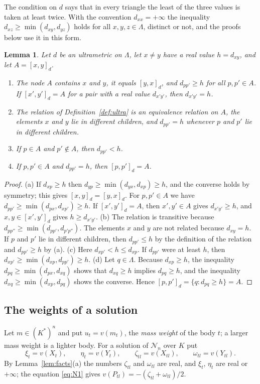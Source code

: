 \documentclass[11pt]{amsart}
\newtheorem{lemma}[theorem]{Lemma}
\theoremstyle{definition}
\theoremstyle{remark}
\numberwithin{equation}{section}
\newcommand{\cN}{\mathcal{N}}
\newcommand{\nd}[2]{[#1]_{#2}}
\begin{document}
The condition on $d$ says that in every triangle the least of the three values is taken at least twice.
With the convention $d_{xx} = +\infty$ the inequality $d_{xz} \ge \min(d_{xy}, d_{yz})$ holds for all
$x, y, z \in \Lambda$, distinct or not, and the proofs below use it in this form.

\begin{lemma}\label{lem:tree}
Let $d$ be an ultrametric on $\Lambda$, let $x \ne y$ have a real value $h = d_{xy}$, and let
$A = \nd{x, y}{d}$.
\begin{enumerate}
\item[(a)] The node $A$ contains $x$ and $y$, it equals $\nd{y, x}{d}$, and $d_{pp'} \ge h$ for all
$p, p' \in A$. If $\nd{x', y'}{d} = A$ for a pair with a real value $d_{x'y'}$, then $d_{x'y'} = h$.
\item[(b)] The relation of Definition~\ref{def:ultra} is an equivalence relation on $A$, the elements $x$
and $y$ lie in different children, and $d_{pp'} = h$ whenever $p$ and $p'$ lie in different children.
\item[(c)] If $p \in A$ and $p' \notin A$, then $d_{pp'} < h$.
\item[(d)] If $p, p' \in A$ and $d_{pp'} = h$, then $\nd{p, p'}{d} = A$.
\end{enumerate}
\end{lemma}

\begin{proof}
(a) If $d_{xp} \ge h$ then $d_{yp} \ge \min(d_{yx}, d_{xp}) \ge h$, and the converse holds by symmetry;
this gives $\nd{x, y}{d} = \nd{y, x}{d}$. For $p, p' \in A$ we have
$d_{pp'} \ge \min(d_{px}, d_{xp'}) \ge h$. If $\nd{x', y'}{d} = A$, then $x', y' \in A$ gives
$d_{x'y'} \ge h$, and $x, y \in \nd{x', y'}{d}$ gives $h \ge d_{x'y'}$. (b) The relation is transitive
because $d_{pp''} \ge \min(d_{pp'}, d_{p'p''})$. The elements $x$ and $y$ are not related because
$d_{xy} = h$. If $p$ and $p'$ lie in different children, then $d_{pp'} \le h$ by the definition of the
relation and $d_{pp'} \ge h$ by (a). (c) Here $d_{xp'} < h \le d_{xp}$. If $d_{pp'}$ were at least $h$,
then $d_{xp'} \ge \min(d_{xp}, d_{pp'}) \ge h$. (d) Let $q \in \Lambda$. Because
$d_{xp} \ge h$, the inequality $d_{pq} \ge \min(d_{px}, d_{xq})$ shows that $d_{xq} \ge h$ implies
$d_{pq} \ge h$, and the inequality $d_{xq} \ge \min(d_{xp}, d_{pq})$ shows the converse. Hence
$\nd{p, p'}{d} = \{ q : d_{pq} \ge h \} = A$.
\end{proof}

\subsection{The weights of a solution} Let $m \in (K^{*})^n$ and put $u_t = v(m_t)$, the \emph{mass
weight} of the body $t$; a larger mass weight is a lighter body. For a solution of $\cN_n$ over $K$ put
\[
  \xi_t = v(X_t), \qquad \eta_t = v(Y_t), \qquad \zeta_{tl} = v(X_{tl}), \qquad \omega_{tl} = v(Y_{tl}).
\]
By Lemma~\ref{lem:facts}(a) the numbers $\zeta_{tl}$ and $\omega_{tl}$ are real, and $\xi_t$, $\eta_t$
are real or $+\infty$; the equation \eqref{eq:N1} gives $v(P_{tl}) = -(\zeta_{tl} + \omega_{tl})/2$.
\end{document}
